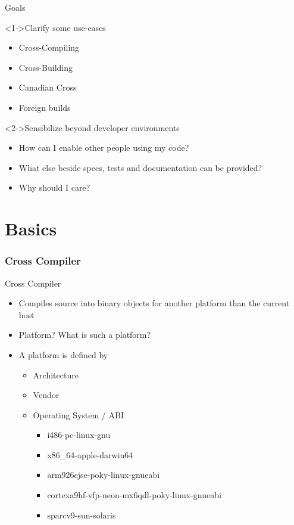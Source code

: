 \documentclass[ngerman,xcolor={table,dvipsnames},smaller,compress,hyperref={bookmarks,colorlinks}]{beamer}%
\begin{document}
\begin{frame}[fragile]{Goals}
\begin{block}<1->{Clarify some use-cases}
\begin{itemize}
\item Cross-Compiling
\item Cross-Building
\item Canadian Cross
\item Foreign builds
\end{itemize}
\end{block}

\begin{block}<2->{Sensibilize beyond developer environments}
\begin{itemize}
\item How can I enable other people using my code?
\item What else beside specs, tests and documentation can be provided?
\item Why should I care?
\end{itemize}
\end{block}
\end{frame}

\part{Basics}

\section{Cross Compiler}

\begin{frame}[fragile]{Cross Compiler}
\begin{itemize}
\item Compiles source into binary objects for another platform than the current host
\item<2-> Platform? What is such a platform?
\item<3-> A platform is defined by
\begin{itemize}
\item<3-> Architecture
\item<3-> Vendor
\item<3-> Operating System / ABI
\begin{itemize}
\item<4-> i486-pc-linux-gnu
\item<4-> x86\_64-apple-darwin64
\item<5-> arm926ejse-poky-linux-gnueabi
\item<5-> cortexa9hf-vfp-neon-mx6qdl-poky-linux-gnueabi
\item<6-> sparcv9-sun-solaris
\end{itemize}
\end{itemize}
\end{itemize}
\end{frame}
\end{document}
